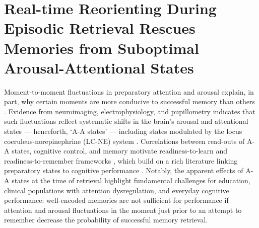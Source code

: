 \chapter[Real-time Reorienting During Episodic Retrieval Rescues Memories]{Real-time Reorienting During Episodic Retrieval Rescues Memories from Suboptimal Arousal-Attentional States}

Moment-to-moment fluctuations in preparatory attention and arousal explain, in part, why certain moments are more conducive to successful memory than others \parencite{robison2022pupillary,miller2020variation,miller2019individual,cohen2015peri,madore2022readiness,madore2020memory,cohen2020prestimulus,evans2019preretrieval,curran2004effects,craik1996effects,baddeley1984attention,anderson1995status,soravia2016prestimulus,schwartz2025attending}. Evidence from neuroimaging, electrophysiology, and pupillometry indicates that such fluctuations reflect systematic shifts in the brain's arousal and attentional states — henceforth, `A-A states' — including states modulated by the locus coeruleus-norepinephrine (LC-NE) system \parencite{costa2016more,joshi2016relationships,sara2009locus,munn2021ascending,murphy2011pupillometry,murphy2014pupil,hong2014your,groot2021probing,huang2024locus}. Correlations between read-outs of A-A states, cognitive control, and memory motivate readiness-to-learn and readiness-to-remember frameworks \parencite{madore2022readiness,madore2020memory,schwartz2025attending,morcom2002getting}, which build on a rich literature linking preparatory states to cognitive performance \parencite{awh2012top,corbetta2002control,corbetta2008reorienting,debettencourt2018forgetting,fortenbaugh2015sustained,uncapher2009selecting,waskom2014frontoparietal,yoo2012when,aly2017how,strunk2019prestimulus,badre2018frontal,esterman2013zone,compton2019wandering,turnbull2019ebb,joshi2020pupil}. Notably, the apparent effects of A-A states at the time of retrieval highlight fundamental challenges for education, clinical populations with attention dysregulation, and everyday cognitive performance: well-encoded memories are not sufficient for performance if attention and arousal fluctuations in the moment just prior to an attempt to remember decrease the probability of successful memory retrieval.

